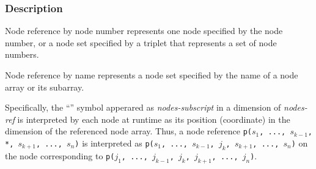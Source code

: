 
\subsubsection*{Description}

Node reference by node number represents one node specified by the node 
number, or a node set specified by a triplet that represents a set of
node numbers.

Node reference by name represents a node set specified by the name of a
node array or its subarray.


Specifically, the ``{\tt *}'' symbol apperared as {\it nodes-subscript}
in a dimension of {\it nodes-ref} is interpreted by each node at runtime
as its position (coordinate) in the dimension of the referenced node
array.
%
Thus, a node reference {\tt p($s_1$, ..., $s_{k-1}$, *, $s_{k+1}$, ...,
$s_n$)} is interpreted as {\tt p($s_1$, ..., $s_{k-1}$, $j_k$,
$s_{k+1}$, ..., $s_n$)} on the node corresponding to {\tt p($j_1$, ...,
$j_{k-1}$, $j_k$, $j_{k+1}$, ..., $j_n$)}.

%

